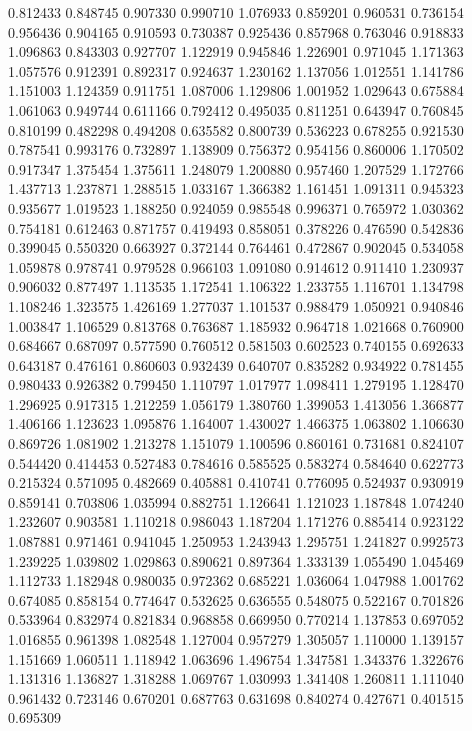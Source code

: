 0.812433
0.848745
0.907330
0.990710
1.076933
0.859201
0.960531
0.736154
0.956436
0.904165
0.910593
0.730387
0.925436
0.857968
0.763046
0.918833
1.096863
0.843303
0.927707
1.122919
0.945846
1.226901
0.971045
1.171363
1.057576
0.912391
0.892317
0.924637
1.230162
1.137056
1.012551
1.141786
1.151003
1.124359
0.911751
1.087006
1.129806
1.001952
1.029643
0.675884
1.061063
0.949744
0.611166
0.792412
0.495035
0.811251
0.643947
0.760845
0.810199
0.482298
0.494208
0.635582
0.800739
0.536223
0.678255
0.921530
0.787541
0.993176
0.732897
1.138909
0.756372
0.954156
0.860006
1.170502
0.917347
1.375454
1.375611
1.248079
1.200880
0.957460
1.207529
1.172766
1.437713
1.237871
1.288515
1.033167
1.366382
1.161451
1.091311
0.945323
0.935677
1.019523
1.188250
0.924059
0.985548
0.996371
0.765972
1.030362
0.754181
0.612463
0.871757
0.419493
0.858051
0.378226
0.476590
0.542836
0.399045
0.550320
0.663927
0.372144
0.764461
0.472867
0.902045
0.534058
1.059878
0.978741
0.979528
0.966103
1.091080
0.914612
0.911410
1.230937
0.906032
0.877497
1.113535
1.172541
1.106322
1.233755
1.116701
1.134798
1.108246
1.323575
1.426169
1.277037
1.101537
0.988479
1.050921
0.940846
1.003847
1.106529
0.813768
0.763687
1.185932
0.964718
1.021668
0.760900
0.684667
0.687097
0.577590
0.760512
0.581503
0.602523
0.740155
0.692633
0.643187
0.476161
0.860603
0.932439
0.640707
0.835282
0.934922
0.781455
0.980433
0.926382
0.799450
1.110797
1.017977
1.098411
1.279195
1.128470
1.296925
0.917315
1.212259
1.056179
1.380760
1.399053
1.413056
1.366877
1.406166
1.123623
1.095876
1.164007
1.430027
1.466375
1.063802
1.106630
0.869726
1.081902
1.213278
1.151079
1.100596
0.860161
0.731681
0.824107
0.544420
0.414453
0.527483
0.784616
0.585525
0.583274
0.584640
0.622773
0.215324
0.571095
0.482669
0.405881
0.410741
0.776095
0.524937
0.930919
0.859141
0.703806
1.035994
0.882751
1.126641
1.121023
1.187848
1.074240
1.232607
0.903581
1.110218
0.986043
1.187204
1.171276
0.885414
0.923122
1.087881
0.971461
0.941045
1.250953
1.243943
1.295751
1.241827
0.992573
1.239225
1.039802
1.029863
0.890621
0.897364
1.333139
1.055490
1.045469
1.112733
1.182948
0.980035
0.972362
0.685221
1.036064
1.047988
1.001762
0.674085
0.858154
0.774647
0.532625
0.636555
0.548075
0.522167
0.701826
0.533964
0.832974
0.821834
0.968858
0.669950
0.770214
1.137853
0.697052
1.016855
0.961398
1.082548
1.127004
0.957279
1.305057
1.110000
1.139157
1.151669
1.060511
1.118942
1.063696
1.496754
1.347581
1.343376
1.322676
1.131316
1.136827
1.318288
1.069767
1.030993
1.341408
1.260811
1.111040
0.961432
0.723146
0.670201
0.687763
0.631698
0.840274
0.427671
0.401515
0.695309
